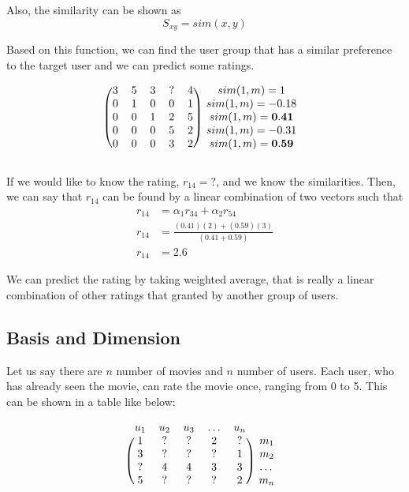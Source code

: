 \documentclass[paper=letter, fontsize=12pt]{scrartcl} %
\numberwithin{equation}{section} %
\numberwithin{figure}{section} %
\numberwithin{table}{section} %
\begin{document}
  Also, the similarity can be shown as
  \[
    S_{xy} = sim(x,y)
  \]

  Based on this function, we can find the user group that has a similar
  preference to the target user and we can predict some ratings.

  \[
    \begin{blockarray}{cccccc}
      \begin{block}{(ccccc)c}
        3 & 5 & 3 & \mathbf{?} & 4 & sim(1,m) = 1 \\
        0 & 1 & 0 & 0 & 1 & sim(1,m) = -0.18 \\
        0 & 0 & 1 & 2 & 5 & sim(1,m) = \mathbf{0.41} \\
        0 & 0 & 0 & 5 & 2 & sim(1,m) = -0.31 \\
        0 & 0 & 0 & 3 & 2 & sim(1,m) = \mathbf{0.59} \\
      \end{block}
    \end{blockarray}
  \]

  If we would like to know the rating, \(r_{14} = ?\), and we know the
  similarities. Then, we can say that \(r_{14}\) can be found by a linear
  combination of two vectors such that
  \[
    \begin{split}
      r_{14} & = \alpha_1 r_{34} + \alpha_2 r_{54} \\
      r_{14} & = \frac{(0.41)(2) + (0.59)(3)}{(0.41 + 0.59)} \\
      r_{14} & = 2.6
    \end{split}
  \]

  We can predict the rating by taking weighted average, that is really a linear
  combination of other ratings that granted by another group of users.

  \subsection{Basis and Dimension}

  Let us say there are \(n\) number of movies and \(n\) number of users. Each user, who
  has already seen the movie, can rate the movie once, ranging from 0 to 5. This
  can be shown in a table like below:

  \[
    \begin{blockarray}{cccccc}
      u_1 & u_2 & u_3 & \dots & u_n \\
      \begin{block}{(ccccc)c}
        1 & ? & ? & 2 & ? & m_1 \\
        3 & ? & ? & ? & 1 & m_2 \\
        ? & 4 & 4 & 3 & 3 & \dots \\
        5 & ? & ? & ? & 2 & m_n \\
      \end{block}
    \end{blockarray}
  \]
\end{document}
